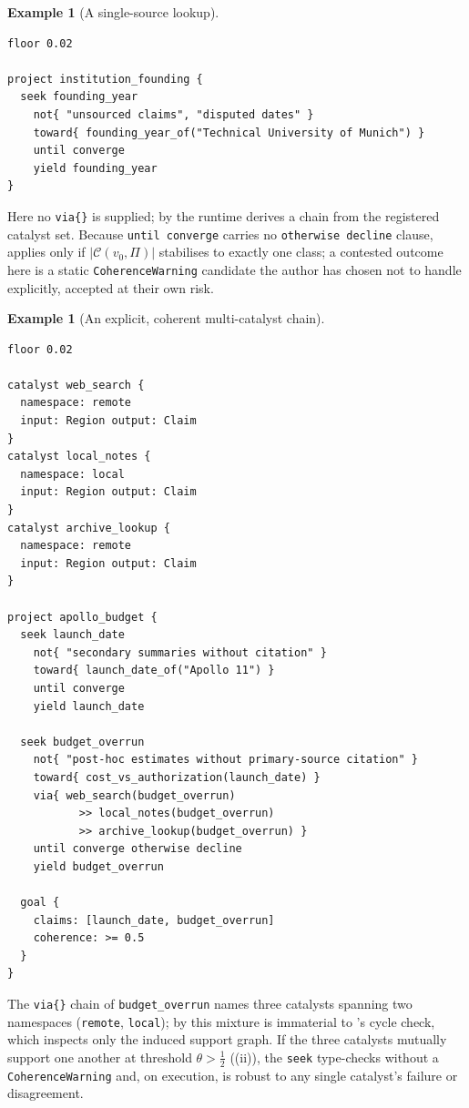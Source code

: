 \documentclass[11pt,twocolumn,a4paper]{article}
\theoremstyle{thmstyle}
\theoremstyle{definition}
\newtheorem{example}[theorem]{Example}
\theoremstyle{remark}
\newcommand{\Proc}{\Pi}
\newcommand{\Cell}{\mathcal{C}}
\newcommand{\abs}[1]{\lvert#1\rvert}
\begin{document}
\begin{example}[A single-source lookup]
\label{ex:single}
\begin{lstlisting}[caption={A surgical single-fact lookup.}]
floor 0.02

project institution_founding {
  seek founding_year
    not{ "unsourced claims", "disputed dates" }
    toward{ founding_year_of("Technical University of Munich") }
    until converge
    yield founding_year
}
\end{lstlisting}
Here no \texttt{via\{\}} is supplied; by  the runtime
derives a chain from the registered catalyst set. Because
\texttt{until converge} carries no \texttt{otherwise decline} clause,
 applies only if $\abs{\Cell(v_0,\Proc)}$ stabilises
to exactly one class; a contested outcome here is a static
\texttt{CoherenceWarning} candidate the author has chosen not to handle
explicitly, accepted at their own risk.
\end{example}

\begin{example}[An explicit, coherent multi-catalyst chain]
\label{ex:coherent}
\begin{lstlisting}[caption={A coherent triangle of independent sources.}]
floor 0.02

catalyst web_search {
  namespace: remote
  input: Region output: Claim
}
catalyst local_notes {
  namespace: local
  input: Region output: Claim
}
catalyst archive_lookup {
  namespace: remote
  input: Region output: Claim
}

project apollo_budget {
  seek launch_date
    not{ "secondary summaries without citation" }
    toward{ launch_date_of("Apollo 11") }
    until converge
    yield launch_date

  seek budget_overrun
    not{ "post-hoc estimates without primary-source citation" }
    toward{ cost_vs_authorization(launch_date) }
    via{ web_search(budget_overrun)
           >> local_notes(budget_overrun)
           >> archive_lookup(budget_overrun) }
    until converge otherwise decline
    yield budget_overrun

  goal {
    claims: [launch_date, budget_overrun]
    coherence: >= 0.5
  }
}
\end{lstlisting}
The \texttt{via\{\}} chain of \texttt{budget\_overrun} names three
catalysts spanning two namespaces (\texttt{remote}, \texttt{local}); by
 this mixture is immaterial to
's cycle check, which inspects only the induced
support graph. If the three catalysts mutually support one another at
threshold $\theta>\tfrac12$ ((ii)), the \texttt{seek}
type-checks without a \texttt{CoherenceWarning} and, on execution, is
robust to any single catalyst's failure or disagreement.
\end{example}
\end{document}
